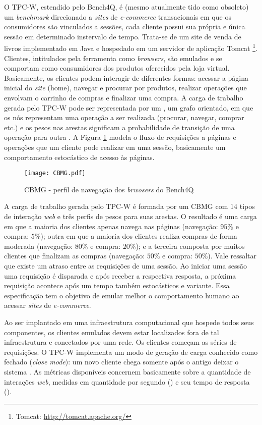 O TPC-W, estendido pelo Bench4Q, é (mesmo atualmente tido como obsoleto) um \textit{ benchmark} direcionado a \textit{sites} de \textit{e-commerce} transacionais em que os consumidores são vinculados a sessões, cada cliente possui sua própria e única sessão em determinado instervalo de tempo. Trata-se de um site de venda de livros implementado em Java e hospedado em um servidor de aplicação Tomcat \footnote{Tomcat: \url{http://tomcat.apache.org/}}. Clientes, intitulados pela ferramenta como \textit{browsers}, são emulados e se comportam como consumidores dos produtos oferecidos pela loja virtual. Basicamente, os clientes podem interagir de diferentes formas: acessar a página inicial do \textit{site} (home), navegar e procurar por produtos, realizar operações que envolvam o carrinho de compras e finalizar uma compra. A carga de trabalho gerada pelo TPC-W pode ser representada por um , um grafo orientado, em que os nós representam uma operação a ser realizada (procurar, navegar, comprar etc.) e os pesos nas arestas significam a probabilidade de transição de uma operação para outra \cite{Zhang2011}. A Figura \ref{fig:CBMG} modela o fluxo de requisições a páginas e operações que um cliente pode realizar em uma sessão, basicamente um comportamento estocástico de acesso às páginas.

\begin{figure}[htb]
	\caption{CBMG - perfil de navegação dos \textit{brwosers} do Bench4Q}
	\label{fig:CBMG}
	\centering
	\texttt{[image: CBMG.pdf]}
\end{figure}


A carga de trabalho gerada pelo TPC-W é formada por um CBMG com 14 tipos de interação \textit{web} e três perfis de pesos para suas arestas. O resultado é uma carga em que a maioria dos clientes apenas navega nas páginas (navegação: $95\%$ e compra: $5\%$); outra em que a maioria dos clientes realiza compras de forma moderada (navegação: $80\%$ e compra: $20\%$); e a terceira composta por muitos clientes que finalizam as compras (navegação: $50\%$ e compra: $50\%$). Vale ressaltar que existe um atraso entre as requisições de uma sessão. Ao iniciar uma sessão uma requisição é disparada e após receber a respectiva resposta, a próxima requisição acontece após um tempo também estocásticos e variante. Essa especificação tem o objetivo de emular melhor o comportamento humano ao acessar \textit{sites} de \textit{ e-commerce}.

Ao ser implantado em uma infraestrutura computacional que hospede todos seus componentes, os clientes emulados devem estar localizados fora de tal infraestrutura e conectados por uma rede. Os clientes começam as séries de requisições. O TPC-W implementa um modo de geração de carga conhecido como fechado (\textit{close mode}): um novo cliente chega somente após o antigo deixar o sistema \cite{Zhang2011}. As métricas disponíveis concernem basicamente sobre a quantidade de interações \textit{web}, medidas em quantidade por segundo () e seu tempo de resposta ().

